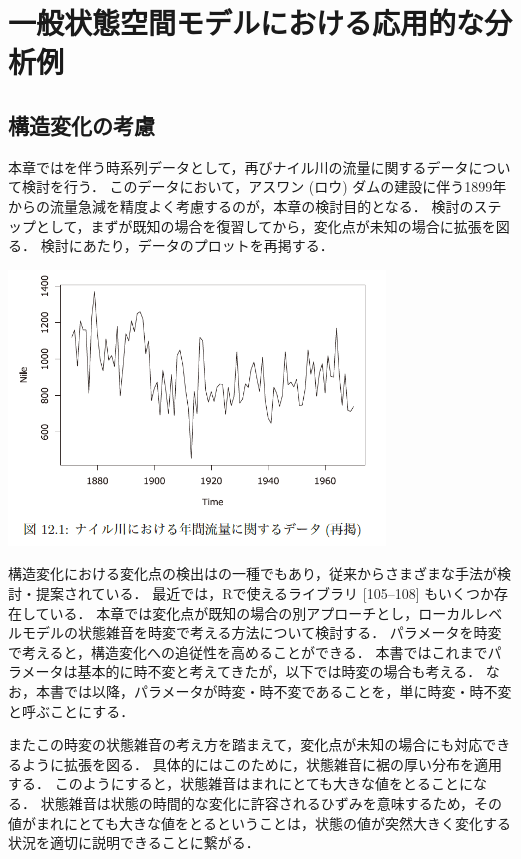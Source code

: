 \documentclass[11pt,a4paper]{jsarticle}
\numberwithin{equation}{section}
\begin{document}
\setcounter{section}{11}
\section{一般状態空間モデルにおける応用的な分析例}

\subsection{構造変化の考慮}
本章ではを伴う時系列データとして，再びナイル川の流量に関するデータについて検討を行う．
このデータにおいて，アスワン (ロウ) ダムの建設に伴う1899年からの流量急減を精度よく考慮するのが，本章の検討目的となる．
検討のステップとして，まずが既知の場合を復習してから，変化点が未知の場合に拡張を図る．
検討にあたり，データのプロットを再掲する．
\begin{center}
\includegraphics[width=10cm]{img/Figure12_1.png}
\end{center}

構造変化における変化点の検出はの一種でもあり，従来からさまざまな手法が検討・提案されている．
最近では，Rで使えるライブラリ [105–108] もいくつか存在している．
本章では変化点が既知の場合の別アプローチとし，ローカルレベルモデルの状態雑音を時変で考える方法について検討する．
パラメータを時変で考えると，構造変化への追従性を高めることができる．
本書ではこれまでパラメータは基本的に時不変と考えてきたが，以下では時変の場合も考える．
なお，本書では以降，パラメータが時変・時不変であることを，単に時変・時不変と呼ぶことにする．

またこの時変の状態雑音の考え方を踏まえて，変化点が未知の場合にも対応できるように拡張を図る．
具体的にはこのために，状態雑音に裾の厚い分布を適用する．
このようにすると，状態雑音はまれにとても大きな値をとることになる．
状態雑音は状態の時間的な変化に許容されるひずみを意味するため，その値がまれにとても大きな値をとるということは，状態の値が突然大きく変化する状況を適切に説明できることに繋がる．
\end{document}
